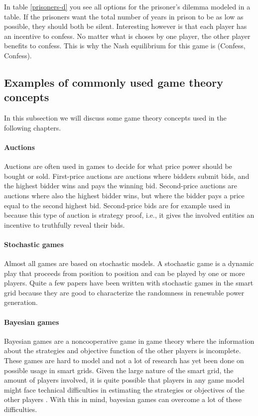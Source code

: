 In table \ref{prisoners-d} you see all options for the prisoner's dilemma modeled in a table. If the prisoners want the total number of years in prison to be as low as possible, they should both be silent. Interesting however is that each player has an incentive to confess. No matter what is choses by one player, the other player benefits to confess. This is why the Nash equilibrium for this game is (Confess, Confess).    

\subsection{Examples of commonly used game theory concepts}
In this subsection we will discuss some game theory concepts used in the following chapters. 

\paragraph{Auctions}
Auctions are often used in games to decide for what price power should be bought or sold. First-price auctions are auctions where bidders submit bids, and the highest bidder wins and pays the winning bid. Second-price auctions are auctions where also the highest bidder wins, but where the bidder pays a price equal to the second highest bid. Second-price bids are for example used in \cite{SaadHanPoorEtAl2011} because this type of auction is strategy proof, i.e., it gives the involved entities an incentive to truthfully reveal their bids.
\paragraph{Stochastic games}
Almost all games are based on stochastic models. A stochastic game is a dynamic play that proceeds from position to position \cite{Shapley1953} and can be played by one or more players. Quite a few papers have been written with stochastic games in the smart grid \cite{LiangZhuang2014} because they are good to characterize the randomness in renewable power generation.  
\paragraph{Bayesian games}
Bayesian games are a noncooperative game in game theory where the information about the strategies and objective function of the other players is incomplete. These games are hard to model and not a lot of research has yet been done on possible usage in smart grids. Given the large nature of the smart grid, the amount of players involved, it is quite possible that players in any game model might face technical difficulties in estimating the strategies or objectives of the other players \cite{keypaper}. With this in mind, bayesian games can overcome a lot of these difficulties. 
